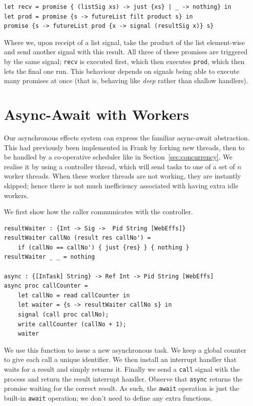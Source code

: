 \documentclass[msc,deptreport,cs]{infthesis} %
\newcommand{\code}[1]{\lstinline{#1}}
\newcommand{\todo}[1]
           {{\par\noindent\small\color{RoyalPurple}
  \framebox{\parbox{\dimexpr\linewidth-2\fboxsep-2\fboxrule}
    {\textbf{TODO:} #1}}}}
\begin{document}
\begin{lstlisting}
let recv = promise { (listSig xs) -> just {xs} | _ -> nothing} in
let prod = promise {s -> futureList filt product s} in
promise {s -> futureList prod {x -> signal (resultSig x)} s}
\end{lstlisting}

\noindent Where we, upon receipt of a list signal, take the product of the list
element-wise and send another signal with this result. All three of these
promises are triggered by the same signal; \code{recv} is executed first, which
then executes \code{prod}, which then lets the final one run. This behaviour
depends on signals being able to execute many promises at once (that is,
behaving like \emph{deep} rather than shallow handlers).



\section{Async-Await with Workers}

Our asynchronous effects system can express the familiar async-await
abstraction. This had previously been implemented in Frank by forking new
threads, then to be handled by a co-operative scheduler like in
Section~\ref{sec:concurrency}. We realise it by using a controller thread, which
will send tasks to one of a set of $n$ worker threads. When these worker threads
are not working, they are instantly skipped; hence there is not much
inefficiency associated with having extra idle workers.

We first show how the caller communicates with the controller.

\begin{lstlisting}
resultWaiter : {Int -> Sig ->  Pid String [WebEffs]}
resultWaiter callNo (result res callNo') =
    if (callNo == callNo') { just {res} } { nothing }
resultWaiter _ _ = nothing

async : {[InTask] String} -> Ref Int -> Pid String [WebEffs]
async proc callCounter =
    let callNo = read callCounter in
    let waiter = {s -> resultWaiter callNo s} in
    signal (call proc callNo);
    write callCounter (callNo + 1);
    waiter
\end{lstlisting}

\todo{Talk about interface aliases}

We use this function to issue a new asynchronous task. We keep a global counter
to give each call a unique identifier. We then install an interrupt handler that
waits for a result and simply returns it. Finally we send a \code{call} signal
with the process and return the result interrupt handler. Observe that
\code{async} returns the promise waiting for the correct result. As such, the
\code{await} operation is just the built-in \code{await} operation; we don't
need to define any extra functions.
\end{document}
